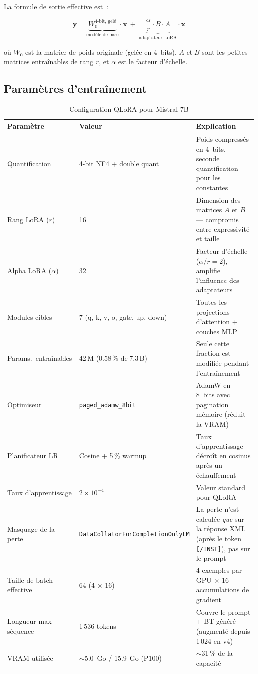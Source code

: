 \documentclass[a4paper,11pt]{article}
\begin{document}
La formule de sortie effective est~:

\begin{equation}
\mathbf{y} = \underbrace{W_0^{\text{4-bit, gelé}}}_{\text{modèle de base}}
\cdot \mathbf{x}
\;+\;
\underbrace{\frac{\alpha}{r} \cdot B \cdot A}_{\text{adaptateur LoRA}}
\cdot \mathbf{x}
\end{equation}

où $W_0$ est la matrice de poids originale (gelée en 4~bits), $A$ et $B$
sont les petites matrices entraînables de rang $r$, et $\alpha$ est le
facteur d'échelle.

\subsection{Paramètres d'entraînement}

\begin{table}[h]
\centering
\caption{Configuration QLoRA pour Mistral-7B}
\label{tab:qlora-config}
\begin{tabular}{@{}l l p{6cm}@{}}
\toprule
\textbf{Paramètre} & \textbf{Valeur} & \textbf{Explication} \\
\midrule
Quantification & 4-bit NF4 + double quant & Poids compressés en 4~bits,
seconde quantification pour les constantes \\
Rang LoRA ($r$) & 16 & Dimension des matrices $A$ et $B$ --- compromis
entre expressivité et taille \\
Alpha LoRA ($\alpha$) & 32 & Facteur d'échelle ($\alpha/r = 2$), amplifie
l'influence des adaptateurs \\
Modules cibles & 7 (q, k, v, o, gate, up, down) & Toutes les projections
d'attention + couches MLP \\
Params.\ entraînables & 42\,M (0.58\,\% de 7.3\,B) & Seule cette
fraction est modifiée pendant l'entraînement \\
Optimiseur & \texttt{paged\_adamw\_8bit} & AdamW en 8~bits avec pagination
mémoire (réduit la VRAM) \\
Planificateur LR & Cosine + 5\,\% warmup & Taux d'apprentissage décroît en
cosinus après un échauffement \\
Taux d'apprentissage & $2 \times 10^{-4}$ & Valeur standard pour QLoRA \\
Masquage de la perte & \texttt{DataCollator\-ForCompletion\-OnlyLM} &
La perte n'est calculée \emph{que} sur la réponse XML (après le token
\texttt{[/INST]}), pas sur le prompt \\
Taille de batch effective & 64 (4 $\times$ 16) & 4 exemples par GPU
$\times$ 16 accumulations de gradient \\
Longueur max séquence & 1\,536 tokens & Couvre le prompt + BT généré
(augmenté depuis 1\,024 en v4) \\
VRAM utilisée & $\sim$5.0~Go / 15.9~Go (P100) & $\sim$31\,\% de la
capacité \\
\bottomrule
\end{tabular}
\end{table}
\end{document}
